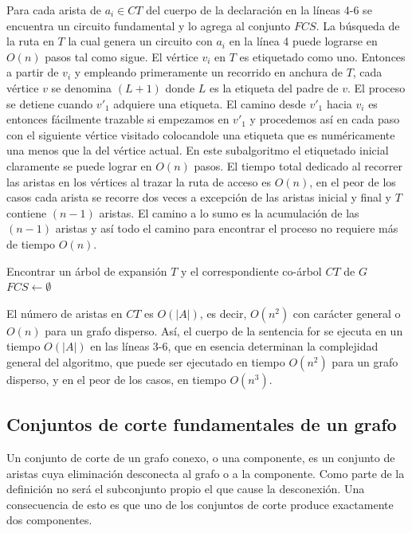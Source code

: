 \documentclass[10pt,a5paper]{book}
\begin{document}
Para cada arista de $a_i \in CT$ del cuerpo de la declaración en la líneas 4-6 se encuentra un circuito fundamental y lo agrega al conjunto $FCS$. La búsqueda de la ruta en $T$ la cual genera un circuito con $a_i$ en la línea 4 puede lograrse en $O(n)$ pasos tal como sigue. El vértice $v_i$ en $T$ es etiquetado como uno. Entonces a partir de $v_i$ y empleando primeramente un recorrido en anchura de $T$, cada vértice $v$ se denomina $(L+1)$ donde $L$ es la etiqueta del padre de $v$. El proceso se detiene cuando $v'_1$ adquiere una etiqueta. El camino desde $v'_1$ hacia $v_i$ es entonces fácilmente trazable si empezamos en $v'_1$ y procedemos así en cada paso con el siguiente vértice visitado colocandole una etiqueta que es numéricamente una menos que la del vértice actual. En este subalgoritmo el etiquetado inicial claramente se puede lograr en $O(n)$ pasos. El tiempo total dedicado al recorrer las aristas en los vértices al trazar la ruta de acceso es $O(n)$, en el peor de los casos cada arista se recorre dos veces a excepción de las aristas inicial y final y $T$ contiene $(n-1)$ aristas. El camino a lo sumo es la acumulación de las $(n-1)$ aristas y así todo el camino para encontrar el proceso no requiere más de tiempo $O(n)$.
\nopagebreak
\begin{algorithm}[H]
\caption{ }
\BlankLine
\dontprintsemicolon
Encontrar un árbol de expansión $T$ y el correspondiente co-árbol $CT$ de $G$\;
$FCS \leftarrow \emptyset$\;
{
}
\end{algorithm}


El número de aristas en $CT$ es $O(|A|)$, es decir, $O(n^2)$ con carácter general o $O(n)$ para un grafo disperso. Así, el cuerpo de la sentencia for se ejecuta en un tiempo $O(|A|)$ en las líneas 3-6, que en esencia determinan la complejidad general del algoritmo, que puede ser ejecutado en tiempo $O(n^2)$ para un grafo disperso, y en el peor de los casos, en tiempo $O(n^3)$.

\subsection{Conjuntos de corte fundamentales de un grafo}

Un conjunto de corte de un grafo conexo, o una componente, es un conjunto de aristas cuya eliminación desconecta al grafo o a la componente. Como parte de la definición no será el subconjunto propio el que cause la desconexión. Una consecuencia de esto es que uno de los conjuntos de corte produce exactamente dos componentes.
\end{document}
